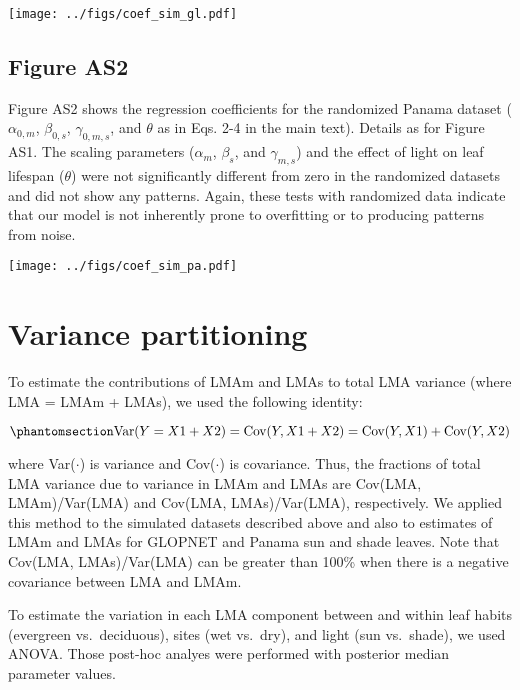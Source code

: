 \documentclass[
  12pt,
  letterpaper,
  DIV=11,
  numbers=noendperiod]{scrartcl}
\numberwithin{equation}{section}
\begin{document}
\texttt{[image: ../figs/coef\_sim\_gl.pdf]}

\newpage

\subsection{Figure AS2}\label{figure-as2}

Figure AS2 shows the regression coefficients for the randomized Panama
dataset (\(\alpha_{0, m}\), \(\beta_{0, s}\), \(\gamma_{0, m, s}\), and
\(\theta\) as in Eqs. 2-4 in the main text). Details as for Figure AS1.
The scaling parameters (\(\alpha_{m}\), \(\beta_{s}\), and
\(\gamma_{m, s}\)) and the effect of light on leaf lifespan (\(\theta\))
were not significantly different from zero in the randomized datasets
and did not show any patterns. Again, these tests with randomized data
indicate that our model is not inherently prone to overfitting or to
producing patterns from noise.

\texttt{[image: ../figs/coef\_sim\_pa.pdf]}

\newpage

\section{Variance partitioning}\label{variance-partitioning}

To estimate the contributions of LMAm and LMAs to total LMA variance
(where LMA = LMAm + LMAs), we used the following identity:

\begin{equation}\phantomsection\label{eq-vpart}{
\mathrm{Var}(Y = X1 + X2) = \mathrm{Cov}(Y, X1+X2) = \mathrm{Cov}(Y,X1) + \mathrm{Cov}(Y,X2)
}\end{equation}

where Var(\(\cdot\)) is variance and Cov(\(\cdot\)) is covariance. Thus,
the fractions of total LMA variance due to variance in LMAm and LMAs are
Cov(LMA, LMAm)/Var(LMA) and Cov(LMA, LMAs)/Var(LMA), respectively. We
applied this method to the simulated datasets described above and also
to estimates of LMAm and LMAs for GLOPNET and Panama sun and shade
leaves. Note that Cov(LMA, LMAs)/Var(LMA) can be greater than 100\% when
there is a negative covariance between LMA and LMAm.

To estimate the variation in each LMA component between and within leaf
habits (evergreen vs.~deciduous), sites (wet vs.~dry), and light (sun
vs.~shade), we used ANOVA. Those post-hoc analyes were performed with
posterior median parameter values.
\end{document}
